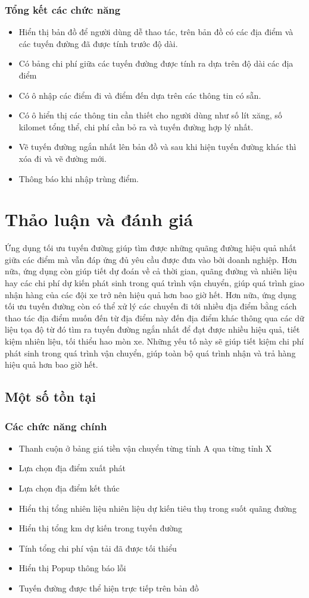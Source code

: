 \documentclass[a4paper]{article}
\begin{document}
\subsubsection{Tổng kết các chức năng}
\begin{itemize}
\item Hiển thị bản đồ để người dùng dễ thao tác, trên bản đồ có các địa điểm và các tuyến đường đã được tính trước độ dài.
\item Có bảng chi phí giữa các tuyến đường được tính ra dựa trên độ dài các địa điểm
\item Có ô nhập các điểm đi và điểm đến dựa trên các thông tin có sẵn.
\item Có ô hiển thị các thông tin cần thiết cho người dùng như số lít xăng, số kilomet tổng thể, chi phí cần bỏ ra và tuyến đường hợp lý nhất.
\item Vẽ tuyến đường ngắn nhất lên bản đồ và sau khi hiện tuyến đường khác thì xóa đi và vẽ đường mới.
\item Thông báo khi nhập trùng điểm.
\end{itemize}
\section{Thảo luận và đánh giá}
Ứng dụng tối ưu tuyến đường giúp tìm được những quãng đường hiệu quả nhất giữa các điểm mà vẫn đáp ứng đủ yêu cầu được đưa vào bởi doanh nghiệp. Hơn nữa, ứng dụng còn giúp tiết dự đoán về cả thời gian, quãng đường và nhiên liệu hay các chi phí dự kiến phát sinh trong quá trình vận chuyển, giúp quá trình giao nhận hàng của các đội xe trở nên hiệu quả hơn bao giờ hết.
Hơn nữa, ứng dụng tối ưu tuyến đường còn có thể xử lý các chuyến đi tới nhiều địa điểm bằng cách thao tác địa điểm muốn đến từ địa điểm này đến địa điểm khác thông qua các dữ liệu tọa độ từ đó tìm ra tuyến đường ngắn nhất để đạt được nhiều hiệu quả, tiết kiệm nhiên liệu, tối thiểu hao mòn xe. Những yếu tố này sẽ giúp tiết kiệm chi phí phát sinh trong quá trình vận chuyển, giúp toàn bộ quá trình nhận và trả hàng hiệu quả hơn bao giờ hết.
\subsection{Một số tồn tại}
\subsubsection{Các chức năng chính}
\begin{itemize}
    \item Thanh cuộn ở bảng giá tiền vận chuyển từng tỉnh A qua từng tỉnh X
    \item Lựa chọn địa điểm xuất phát
    \item Lựa chọn địa điểm kết thúc
    \item Hiển thị tổng nhiên liệu nhiên liệu dự kiến tiêu thụ trong suốt quãng đường
    \item Hiển thị tổng km dự kiến trong tuyến đường
    \item Tính tổng chi phí vận tải đã được tối thiểu
    \item Hiển thị Popup thông báo lỗi
    \item Tuyến đường được thể hiện trực tiếp trên bản đồ
\end{itemize}
\end{document}
